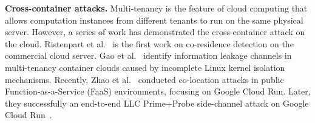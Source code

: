 

\textbf{Cross-container attacks.} Multi-tenancy is the feature of cloud computing that allows computation instances from different tenants to run on the same physical server. However, a series of work has demonstrated the cross-container attack on the cloud.  
 Ristenpart et al.~\cite{ristenpart2009hey}  is the first work on co-residence detection on the commercial cloud server. Gao et al.~\cite{gao2018study} identify information leakage channels in multi-tenancy container clouds caused by incomplete Linux kernel isolation mechanisms. Recently, Zhao et al.~\cite{zhao2024last} conducted co-location attacks in public Function-as-a-Service (FaaS) environments, focusing on Google Cloud Run. Later, they successfully an end-to-end LLC Prime+Probe side-channel attack on Google Cloud Run~\cite{zhao2024everywhere}. 
 
 




